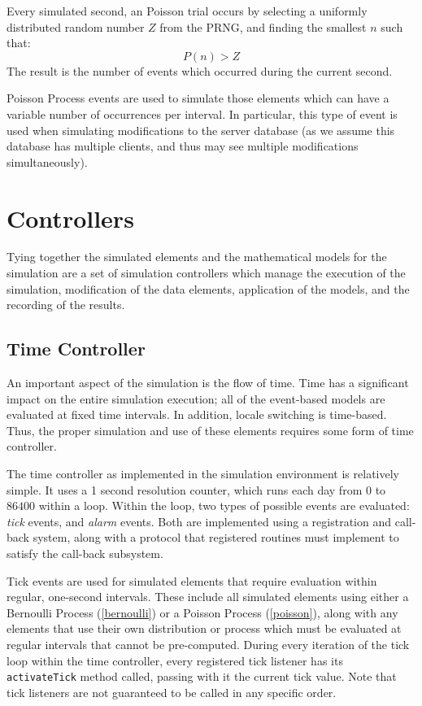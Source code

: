 Every simulated second, an Poisson trial occurs by selecting a uniformly distributed random number $Z$ from the PRNG, and finding the smallest $n$ such that:
\begin{equation}
P(n)>Z\label{poissontrial}
\end{equation}
The result is the number of events which occurred during the current second.

Poisson Process events are used to simulate those elements which can have a variable number of occurrences per interval.  In particular, this type of event is used when simulating modifications to the server database (as we assume this database has multiple clients, and thus may see multiple modifications simultaneously).

\section{Controllers}

Tying together the simulated elements and the mathematical models for the simulation are a set of simulation controllers which manage the execution of the simulation, modification of the data elements, application of the models, and the recording of the results.

\subsection{Time Controller}\label{time_controller}

An important aspect of the simulation is the flow of time.  Time has a significant impact on the entire simulation execution; all of the event-based models are evaluated at fixed time intervals.  In addition, locale switching is time-based.  Thus, the proper simulation and use of these elements requires some form of time controller.

The time controller as implemented in the simulation environment is relatively simple.  It uses a 1 second resolution counter, which runs each day from $0$ to $86400$ within a loop.  Within the loop, two types of possible events are evaluated:  \emph{tick} events, and \emph{alarm} events.  Both are implemented using a registration and call-back system, along with a protocol that registered routines must implement to satisfy the call-back subsystem.

Tick events are used for simulated elements that require evaluation within regular, one-second intervals.  These include all simulated elements using either a Bernoulli Process (\ref{bernoulli}) or a Poisson Process (\ref{poisson}), along with any elements that use their own distribution or process which must be evaluated at regular intervals that cannot be pre-computed.  During every iteration of the tick loop within the time controller, every registered tick listener has its \texttt{activateTick} method called, passing with it the current tick value.  Note that tick listeners are not guaranteed to be called in any specific order.


